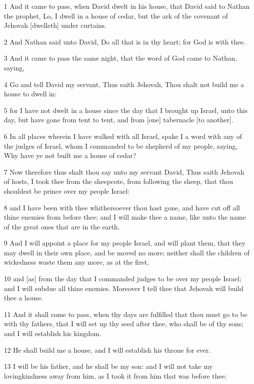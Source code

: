 \par 1 And it came to pass, when David dwelt in his house, that David said to Nathan the prophet, Lo, I dwell in a house of cedar, but the ark of the covenant of Jehovah [dwelleth] under curtains.
\par 2 And Nathan said unto David, Do all that is in thy heart; for God is with thee.
\par 3 And it came to pass the same night, that the word of God came to Nathan, saying,
\par 4 Go and tell David my servant, Thus saith Jehovah, Thou shalt not build me a house to dwell in:
\par 5 for I have not dwelt in a house since the day that I brought up Israel, unto this day, but have gone from tent to tent, and from [one] tabernacle [to another].
\par 6 In all places wherein I have walked with all Israel, spake I a word with any of the judges of Israel, whom I commanded to be shepherd of my people, saying, Why have ye not built me a house of cedar?
\par 7 Now therefore thus shalt thou say unto my servant David, Thus saith Jehovah of hosts, I took thee from the sheepcote, from following the sheep, that thou shouldest be prince over my people Israel:
\par 8 and I have been with thee whithersoever thou hast gone, and have cut off all thine enemies from before thee; and I will make thee a name, like unto the name of the great ones that are in the earth.
\par 9 And I will appoint a place for my people Israel, and will plant them, that they may dwell in their own place, and be moved no more; neither shall the children of wickedness waste them any more, as at the first,
\par 10 and [as] from the day that I commanded judges to be over my people Israel; and I will subdue all thine enemies. Moreover I tell thee that Jehovah will build thee a house.
\par 11 And it shall come to pass, when thy days are fulfilled that thou must go to be with thy fathers, that I will set up thy seed after thee, who shall be of thy sons; and I will establish his kingdom.
\par 12 He shall build me a house, and I will establish his throne for ever.
\par 13 I will be his father, and he shall be my son: and I will not take my lovingkindness away from him, as I took it from him that was before thee;
